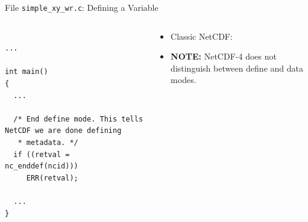 \documentclass[compress,11pt,xcolor=svgnames,aspectratio=169]{beamer}
\begin{document}
\begin{frame}[fragile]{File \texttt{simple\_xy\_wr.c}: Defining a Variable}

\begin{columns}

\begin{column}{0.5\textwidth}

{\tiny

\begin{verbatim}

...

int main()
{
  ...

  /* End define mode. This tells NetCDF we are done defining
   * metadata. */
  if ((retval = nc_enddef(ncid)))
     ERR(retval);

  ...
}

\end{verbatim}

}

\end{column}

\begin{column}{0.5\textwidth}

{\footnotesize

\begin{itemize}
\setlength\itemsep{0.5cm}

\item Classic NetCDF:

\item \textbf{NOTE:} NetCDF-4 does not distinguish between define and data modes.

\end{itemize}

}

\end{column}

\end{columns}

\end{frame}
\end{document}
